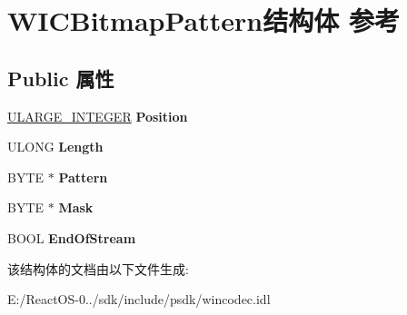 \hypertarget{struct_w_i_c_bitmap_pattern}{}\section{W\+I\+C\+Bitmap\+Pattern结构体 参考}
\label{struct_w_i_c_bitmap_pattern}
\subsection*{Public 属性}
\begin{DoxyCompactItemize}
\item 
\mbox{\label{struct_w_i_c_bitmap_pattern_ae37805100baeb86b343ceabc5abd94f8}} 
\hyperlink{struct___u_l_a_r_g_e___i_n_t_e_g_e_r}{U\+L\+A\+R\+G\+E\+\_\+\+I\+N\+T\+E\+G\+ER} {\bfseries Position}
\item 
\mbox{\label{struct_w_i_c_bitmap_pattern_a51d1b99606443a32fe545ff41256ec1a}} 
U\+L\+O\+NG {\bfseries Length}
\item 
\mbox{\label{struct_w_i_c_bitmap_pattern_a5303611e95522def9d209736e06b5964}} 
B\+Y\+TE $\ast$ {\bfseries Pattern}
\item 
\mbox{\label{struct_w_i_c_bitmap_pattern_a990b8aa42e09586ba37aea2659f67d53}} 
B\+Y\+TE $\ast$ {\bfseries Mask}
\item 
\mbox{\label{struct_w_i_c_bitmap_pattern_aeeec05d5555b4c7dc0531f30f5eecb14}} 
B\+O\+OL {\bfseries End\+Of\+Stream}
\end{DoxyCompactItemize}


该结构体的文档由以下文件生成\+:\begin{DoxyCompactItemize}
\item 
E\+:/\+React\+O\+S-\/0../sdk/include/psdk/wincodec.\+idl\end{DoxyCompactItemize}
